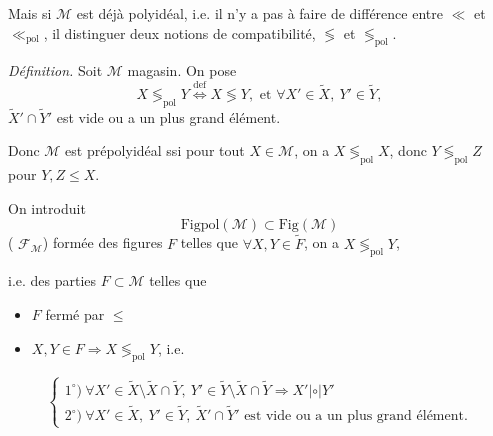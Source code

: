 \documentclass[11pt,a4paper]{article}
\begin{document}
 Mais si $\mathcal{M}$ est déjà polyidéal, i.e. il n'y a pas
à faire de différence entre $\ll$ et $\ll_{\mathrm{pol}}$, il
  distinguer deux notions de compatibilité,
$\lessgtr$ et $\lessgtr_{\mathrm{pol}}$.

\emph{Définition.} Soit $\mathcal{M}$ magasin. On pose
\[
  X \lessgtr_{\mathrm{pol}} Y \overset{\mathrm{def}}{\Longleftrightarrow}
  X \lessgtr Y, \text{ et } \forall X' \in \widetilde{X},\ Y' \in \widetilde{Y},
\]
$\widetilde{X}' \cap \widetilde{Y}'$ est vide ou a un plus grand élément.

Donc $\mathcal{M}$ est prépolyidéal ssi pour tout $X \in \mathcal{M}$, on a
$X \lessgtr_{\mathrm{pol}} X$, donc $Y \lessgtr_{\mathrm{pol}} Z$ pour
$Y, Z \leq X$.


On introduit  
\[
  \mathrm{Figpol}(\mathcal{M}) \subset \mathrm{Fig}(\mathcal{M})
\]
( $\mathcal{F}_{\mathcal{M}}$) formée des figures $F$ telles que
$\forall X, Y \in \widetilde{F}$, on a $X \lessgtr_{\mathrm{pol}} Y$,

i.e. des  parties $F \subset \mathcal{M}$ telles que
\begin{itemize}
  \item[a)] $F$ fermé par $\leq$
  \item[b)] $X, Y \in F \Longrightarrow X \lessgtr_{\mathrm{pol}} Y$, i.e.
\end{itemize}
\[
  \left\{
  \begin{array}{l}
    1^{\circ})\ \forall X' \in \widetilde{X} \setminus \widetilde{X} \cap \widetilde{Y},\
      Y' \in \widetilde{Y} \setminus \widetilde{X} \cap \widetilde{Y}
      \Longrightarrow X' \mathrel{|\circ|} Y' \\
    2^{\circ})\ \forall X' \in \widetilde{X},\ Y' \in \widetilde{Y},\
      \widetilde{X}' \cap \widetilde{Y}' \text{ est vide ou a un plus grand élément.}
  \end{array}
  \right.
\]
\end{document}
